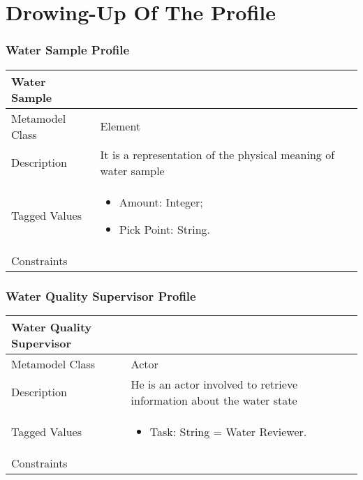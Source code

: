 \chapter{\textbf{Drowing-Up Of The Profile}}

\subsection{Water Sample Profile}

\begin{longtable}{|p{7cm}|p{7cm}|}

\hline
\textbf{Water Sample} & \\


\hline
Metamodel Class & Element\\

\hline
Description & It is a representation of the physical meaning of water sample\\

\hline
Tagged Values & 
\begin{itemize}
\item Amount: Integer;
\item Pick Point: String.
\end{itemize}\\

\hline
Constraints &\\

\hline
\end{longtable}

\subsection{Water Quality Supervisor Profile}

\begin{longtable}{|p{7cm}|p{7cm}|}

\hline
\textbf{Water Quality Supervisor} & \\


\hline
Metamodel Class & Actor\\

\hline
Description & He is an actor involved to retrieve information about the water state\\

\hline
Tagged Values & 
\begin{itemize}
\item Task: String = Water Reviewer.
\end{itemize}\\

\hline
Constraints &\\

\hline
\end{longtable}

